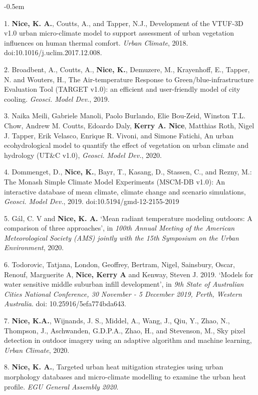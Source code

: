 \begin{list}{}{}
\itemsep-0.5em
\item [1.] \textbf{Nice, K. A.}, Coutts, A., and Tapper, N.J., Development of the VTUF-3D v1.0 urban micro-climate model to support assessment of urban vegetation influences on human thermal comfort. \textit{Urban Climate}, 2018. \\ doi:10.1016/j.uclim.2017.12.008.
\item [2.] Broadbent, A., Coutts, A., \textbf{Nice, K.}, Demuzere, M., Krayenhoff, E., Tapper, N. and Wouters, H., The Air-temperature Response to Green/blue-infrastructure Evaluation Tool (TARGET v1.0): an efficient and user-friendly model of city cooling. \textit{Geosci. Model Dev.}, 2019. 
\item [3.] Naika Meili, Gabriele Manoli, Paolo Burlando, Elie Bou-Zeid, Winston T.L. Chow, Andrew M. Coutts, Edoardo Daly, \textbf{Kerry A. Nice}, Matthias Roth, Nigel J. Tapper, Erik Velasco, Enrique R. Vivoni, and Simone Fatichi, An urban ecohydrological model to quantify the effect of vegetation on urban climate and hydrology (UT\&C v1.0), \textit{Geosci. Model Dev.}, 2020. 
\item [4.] Dommenget, D., \textbf{Nice, K.}, Bayr, T., Kasang, D., Stassen, C., and Rezny, M.: The Monash Simple Climate Model Experiments (MSCM-DB v1.0): An interactive database of mean climate, climate change and scenario simulations, \textit{Geosci. Model Dev.}, 2019. doi:10.5194/gmd-12-2155-2019
\item [5.] G\'{a}l, C. V and \textbf{Nice, K. A.} ‘Mean radiant temperature modeling outdoors: A comparison of three approaches’, in \textit{100th Annual Meeting of the American Meteorological Society (AMS) jointly with the 15th Symposium on the Urban Environment}, 2020. 
\item [6.] Todorovic, Tatjana, London, Geoffrey, Bertram, Nigel, Sainsbury, Oscar, Renouf, Marguerite A, \textbf{Nice, Kerry A} and Kenway, Steven J. 2019. ‘Models for water sensitive middle suburban infill development’, in\textit{ 9th State of Australian Cities National Conference, 30 November - 5 December 2019, Perth, Western Australia}. doi: 10.25916/5efa774bda643. 
\item [7.] \textbf{Nice, K.A.}, Wijnands, J. S., Middel, A., Wang, J., Qiu, Y., Zhao, N., Thompson, J., Aschwanden, G.D.P.A., Zhao, H., and Stevenson, M., Sky pixel detection in outdoor imagery using an adaptive algorithm and machine learning, \textit{Urban Climate}, 2020. 
\item [8.] \textbf{Nice, K. A.}, Targeted urban heat mitigation strategies using urban morphology databases and micro-climate modelling to examine the urban heat profile. \textit{EGU General Assembly 2020}.

\end{list}


